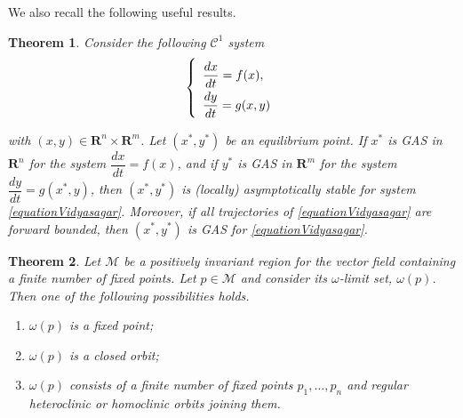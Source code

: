 \documentclass{article}
\newtheorem{theorem}{Theorem}
\begin{document}
We also recall the following useful results.
\begin{theorem}\label{Vidyasagar Theorem} \cite{vidyasagar_decomposition_1980, dumont_mathematical_2012}
Consider the following $\mathcal{C}^1$ system
\begin{equation}
\def\arraystretch{2}
\left\{ \begin{array}{l}
\dfrac{dx}{dt} = f(x), \\
\dfrac{dy}{dt} = g(x, y) 
\end{array} \right.
\label{equationVidyasagar}
\end{equation}

with $(x, y) \in \mathbf{R}^n \times\mathbf{R}^m$. Let $(x^*, y^*)$ be an equilibrium point.
If $x^*$ is GAS in $\mathbf{R}^n$ for the system $\dfrac{dx}{dt} = f(x)$, and if $y^*$ is GAS in $\mathbf{R}^m$ for the system $\dfrac{dy}{dt} = g(x^*, y)$, then $(x^*, y^*)$ is (locally) asymptotically stable for system \eqref{equationVidyasagar}. Moreover, if all trajectories of \eqref{equationVidyasagar} are forward bounded, then $(x^*, y^*)$ is GAS for \eqref{equationVidyasagar}.
\end{theorem}

\begin{theorem} \cite{wiggins_introduction_2003} \label{PoincareBendixson Theorem}
Let $\mathcal{M}$ be a positively invariant region for the vector field containing a finite number of fixed points. Let $p \in \mathcal{M}$ and consider its $\omega$-limit set, $\omega(p)$. Then one of the following possibilities holds.
\begin{enumerate}
\item $\omega(p)$ is a fixed point;
\item $\omega(p)$ is a closed orbit;
\item $\omega(p)$ consists of a finite number of fixed points $p_1, \ldots, p_n$ and regular heteroclinic or homoclinic orbits joining them.
\end{enumerate}
\end{theorem}
\end{document}
